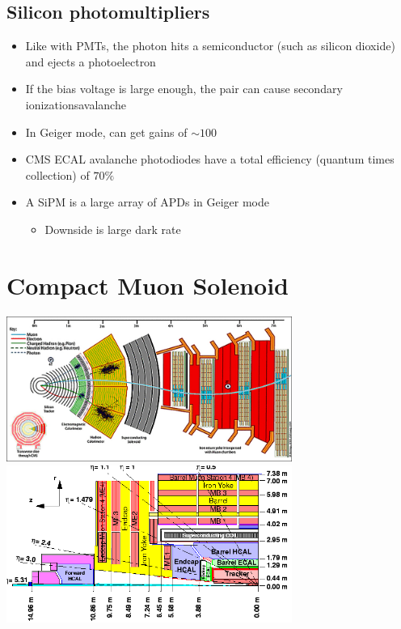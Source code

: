 \subsection{Silicon photomultipliers}
\begin{itemize}
  \item Like with PMTs, the photon hits a semiconductor (such as silicon dioxide) and ejects a photoelectron
  \item If the bias voltage is large enough, the pair can cause secondary ionizations\thus avalanche
  \item In Geiger mode, can get gains of $\sim 100$
  \item CMS ECAL avalanche photodiodes have a total efficiency (quantum times collection) of $70\%$
  \item A SiPM is a large array of APDs in Geiger mode
  \begin{itemize}
    \item Downside is large dark rate
  \end{itemize}
\end{itemize}

\section{Compact Muon Solenoid}
\begin{center}
  \includegraphics[width=0.7\textwidth]{figs/cms_xphi.png}
  \includegraphics[width=0.7\textwidth]{figs/cms_etaz.png}
\end{center}
